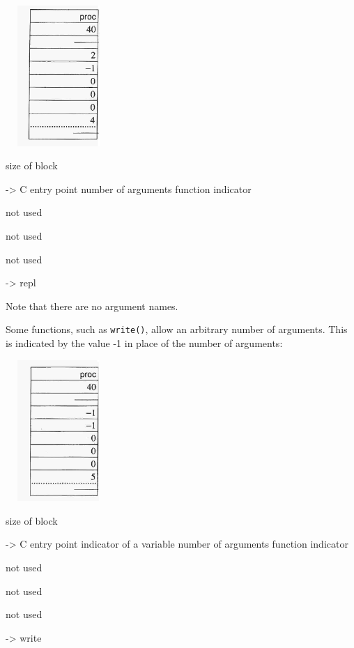 \ \  \includegraphics[width=1.2819in,height=2.1008in]{ib-img/ib-img078.jpg} 

\begin{center}
\begin{minipage}{1.948in}

size of block


{}-{\textgreater} C entry point number of arguments function indicator


not used


not used


not used


\bigskip


\bigskip


{}-{\textgreater} {\textquotedbl}repl{\textquotedbl}
\end{minipage}
\end{center}

Note that there are no argument names.


Some functions, such as \texttt{write()}, allow an arbitrary number of
arguments. This is indicated by the value -1 in place of the number of
arguments:


\ \  \includegraphics[width=1.2819in,height=2.1098in]{ib-img/ib-img079.jpg} 

\begin{center}
\begin{minipage}{3.0154in}

size of block


{}-{\textgreater} C entry point\newline
indicator of a variable number of arguments\newline
function indicator


not used


not used


not used


\bigskip


{}-{\textgreater} {\textquotedbl}write{\textquotedbl}
\end{minipage}
\end{center}


